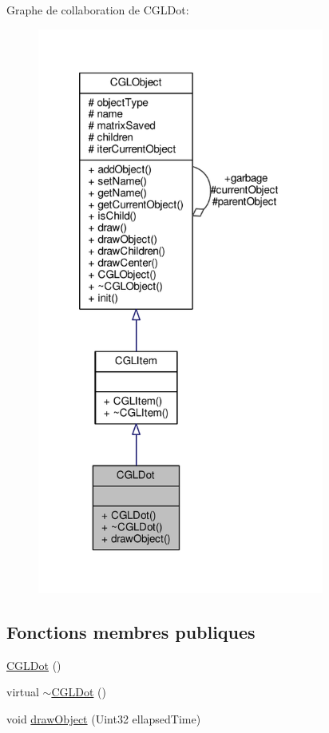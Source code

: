 Graphe de collaboration de C\-G\-L\-Dot\-:\nopagebreak
\begin{figure}[H]
\begin{center}
\leavevmode
\includegraphics[width=267pt]{d7/d23/class_c_g_l_dot__coll__graph}
\end{center}
\end{figure}
\subsection*{Fonctions membres publiques}
\begin{DoxyCompactItemize}
\item 
\hyperlink{class_c_g_l_dot_a2199cd6c78e18219c88bf707201b003c}{C\-G\-L\-Dot} ()
\item 
virtual \hyperlink{class_c_g_l_dot_a9874d2a0168a7d8489c1bb7a6d6dc02c}{$\sim$\-C\-G\-L\-Dot} ()
\item 
void \hyperlink{class_c_g_l_dot_aba6d02d4c9da30aea263599e66e5f201}{draw\-Object} (Uint32 ellapsed\-Time)
\end{DoxyCompactItemize}
